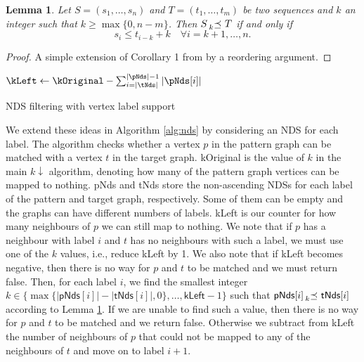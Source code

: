 \documentclass{l4proj}
\newtheorem{lemma}{Lemma}[chapter]
\theoremstyle{definition}
\theoremstyle{remark}
\newcommand{\kprec}[1]{\prescript{}{#1}{\preceq}\ }
\begin{document}
\begin{lemma} \label{lemma1}
  Let $S = (s_1, \dots, s_n)$ and $T = (t_1, \dots, t_m)$ be two sequences and
  $k$ an integer such that $k \ge \max\{ 0, n - m \}$. Then $S \kprec{k} T$
  if and only if
  \[ s_i \le t_{i-k} + k \quad \forall i = k + 1, \dots, n. \]
\end{lemma}
\begin{proof}
  A simple extension of Corollary 1 from \cite{DBLP:conf/aaai/HoffmannMR17} by a
  reordering argument.
\end{proof}

\begin{algorithm}
  $\kLeft \gets \kOriginal - \sum_{i = |\tNds|}^{|\pNds|-1} |\pNds[i]|$\;
  \;
  \caption{NDS filtering with vertex label support}
  \label{alg:nds}
\end{algorithm}

We extend these ideas in Algorithm \ref{alg:nds} by considering an NDS for each
label. The algorithm checks whether a vertex $p$ in the pattern graph can be
matched with a vertex $t$ in the target graph. \textsf{kOriginal} is the value
of $k$ in the main $k\downarrow$ algorithm, denoting how many of the pattern
graph vertices can be mapped to nothing. \textsf{pNds} and \textsf{tNds} store
the non-ascending NDSs for each label of the pattern and target graph,
respectively. Some of them can be empty and the graphs can have different
numbers of labels. \textsf{kLeft} is our counter for how many neighbours of $p$
we can still map to nothing. We note that if $p$ has a neighbour with label $i$
and $t$ has no neighbours with such a label, we must use one of the $k$ values,
i.e., reduce \textsf{kLeft} by 1. We also note that if \textsf{kLeft} becomes
negative, then there is no way for $p$ and $t$ to be matched and we must return
false. Then, for each label $i$, we find the smallest integer $k \in \{
\max \{|\textsf{pNds}[i]| - |\textsf{tNds}[i]|, 0\}, \dots, \textsf{kLeft} -
1\}$ such that $\textsf{pNds}[i] \kprec{k} \textsf{tNds}[i]$ according to Lemma
\ref{lemma1}. If we are unable to find such a value, then there is no way for
$p$ and $t$ to be matched and we return false. Otherwise we subtract from
\textsf{kLeft} the number of neighbours of $p$ that could not be mapped to any
of the neighbours of $t$ and move on to label $i + 1$.
\end{document}

